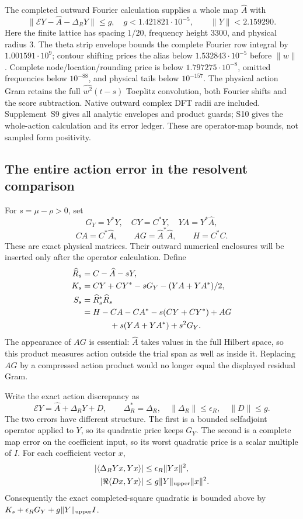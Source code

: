 \documentclass[12pt]{article}
\theoremstyle{remark}\newtheorem{remark}[theorem]{Remark}
\begin{document}
The completed outward Fourier calculation supplies a whole map
$\widehat A$ with
\[
 \|\mathcal E Y-\widehat A-\Delta_RY\|\le g,
 \quad g<1.421821\cdot10^{-5},\qquad \|Y\|<2.159290.
\]
Here the finite lattice has spacing $1/20$, frequency height $3300$,
and physical radius $3$. The theta strip envelope bounds the complete
Fourier row integral by $1.001591\cdot10^9$; contour shifting prices
the alias below $1.532843\cdot10^{-5}$ before $\|w\|$.
Complete node/location/rounding price is below
$1.797275\cdot10^{-8}$, omitted frequencies below $10^{-88}$,
and physical tails below $10^{-157}$.
The physical action Gram retains the full $\widehat{w^2}(t-s)$
Toeplitz convolution, both Fourier shifts and the score subtraction.
Native outward complex DFT radii are included. Supplement~S9 gives
all analytic envelopes and product guards; S10 gives the whole-action calculation and its error ledger. These are operator-map
bounds, not sampled form positivity.

\subsection{The entire action error in the resolvent comparison}
For $s=\mu-\rho>0$, set
\[
 G_Y=Y^*Y,\quad CY=C^*Y,\quad YA=Y^*\widehat A,
\]
\[
 CA=C^*\widehat A,\qquad AG=\widehat A^*\widehat A,
 \qquad H=C^*C.
\]
These are exact physical matrices. Their outward numerical enclosures
will be inserted only after the operator calculation. Define
\begin{align*}
 \widehat R_s&=C-\widehat A-sY,\\
 K_s&=CY+CY^*-sG_Y-(YA+YA^*)/2,\\
 S_s&=\widehat R_s^*\widehat R_s\\
    &=H-CA-CA^*-s(CY+CY^*)+AG\\
    &\hspace{12mm}+s(YA+YA^*)+s^2G_Y.
\end{align*}
The appearance of $AG$ is essential: $\widehat A$ takes values in
the full Hilbert space, so this product measures action outside the
trial span as well as inside it. Replacing $AG$ by a compressed action
product would no longer equal the displayed residual Gram.

Write the exact action discrepancy as
\[
 \mathcal EY=\widehat A+\Delta_RY+D,
 \qquad\Delta_R^*=\Delta_R,\quad
 \|\Delta_R\|\le\epsilon_R,\quad\|D\|\le g.
\]
The two errors have different structure. The first is a bounded
selfadjoint operator applied to $Y$, so its quadratic price keeps
$G_Y$. The second is a complete map error on the coefficient input,
so its worst quadratic price is a scalar multiple of $I$.
For each coefficient vector $x$,
\begin{align*}
 |\langle\Delta_RYx,Yx\rangle|
     &\le\epsilon_R\|Yx\|^2,\\
 |\Re\langle Dx,Yx\rangle|
     &\le g\|Y\|_{\rm upper}\|x\|^2.
\end{align*}
Consequently the exact completed-square quadratic is bounded above by
$K_s+\epsilon_RG_Y+g\|Y\|_{\rm upper}I$.
\end{document}
